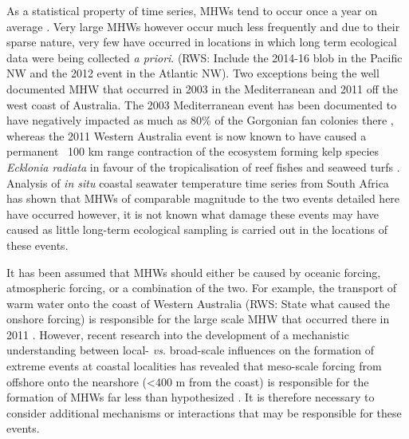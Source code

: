 \documentclass[a4paper,10pt,review]{elsarticle}
\begin{document}
As a statistical property of time series, MHWs tend to occur once a year on average \citep{Schlegel2017}. Very large MHWs however occur much less frequently and due to their sparse nature, very few have occurred in locations in which long term ecological data were being collected \emph{a priori}. (RWS: Include the 2014-16 blob in the Pacific NW and the 2012 event in the Atlantic NW). Two exceptions being the well documented MHW that occurred in 2003 in the Mediterranean and 2011 off the west coast of Australia. The 2003 Mediterranean event has been documented to have negatively impacted as much as 80\% of the Gorgonian fan colonies there \citep{Garrabou2009}, whereas the 2011 Western Australia event is now known to have caused a permanent ~100 km range contraction of the ecosystem forming kelp species \emph{Ecklonia radiata} in favour of the tropicalisation of reef fishes and seaweed turfs \citep{Wernberg2016}. Analysis of \emph{in situ} coastal seawater temperature time series from South Africa has shown that MHWs of comparable magnitude to the two events detailed here have occurred however, it is not known what damage these events may have caused as little long-term ecological sampling is carried out in the locations of these events.

It has been assumed that MHWs should either be caused by oceanic forcing, atmospheric forcing, or a combination of the two. For example, the transport of warm water onto the coast of Western Australia (RWS: State what caused the onshore forcing) is responsible for the large scale MHW that occurred there in 2011 \citep{Feng2013, Pearce2013, Benthuysen2014}. However, recent research into the development of a mechanistic understanding between local- \emph{vs.} broad-scale influences on the formation of extreme events at coastal localities has revealed that meso-scale forcing from offshore onto the nearshore (<400 m from the coast) is responsible for the formation of MHWs far less than hypothesized \citep{Schlegel2017}. It is therefore necessary to consider additional mechanisms or interactions that may be responsible for these events. 
\end{document}
